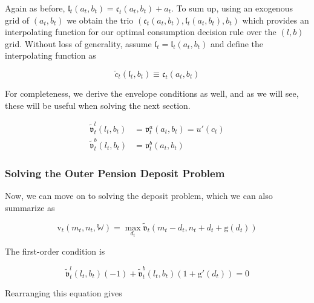 \documentclass{article}
\newcommand{\util}{u}
\newcommand{\bRat}{b}
\newcommand{\cRat}{c}
\newcommand{\vFunc}{\mathrm{v}}
\newcommand{\aRat}{a}
\newcommand{\mRat}{m}
\newcommand{\vOpt}{\tilde{\mathfrak{v}}}
\newcommand{\vEnd}{\mathfrak{v}}
\newcommand{\cEndFunc}{\mathfrak{c}}
\newcommand{\lEndFunc}{\mathfrak{l}}
\newcommand{\nRat}{n}
\newcommand{\dRat}{d}
\newcommand{\gFunc}{\mathrm{g}}
\newcommand{\lRat}{l}
\newcommand{\Work}{\mathbb{W}}
\newcommand{\cTarg}{\check{c}}
\begin{document}
Again as before, $\lEndFunc_{t}(\aRat_{t}, \bRat_{t}) =
    \cEndFunc_{t}(\aRat_{t}, \bRat_{t}) + \aRat_{t}$. To sum up, using an
exogenous
grid of $(\aRat_{t}, \bRat_{t})$ we obtain the trio $(\cEndFunc_{t}(\aRat_{t},
    \bRat_{t}), \lEndFunc_{t}(\aRat_{t},
    \bRat_{t}), \bRat_{t})$ which
provides an
interpolating function for our optimal consumption decision rule over the
$(\lRat, \bRat)$ grid. Without loss of generality, assume $\lEndFunc_{t} =
    \lEndFunc_{t}(\aRat_{t}, \bRat_{t})$ and define the interpolating
function as

\begin{equation}
\cTarg_{t}(\lEndFunc_{t}, \bRat_{t}) \equiv \cEndFunc_{t}(\aRat_{t},
    \bRat_{t})
\end{equation}

For completeness, we derive the envelope conditions as well, and as we will
see, these will be useful when solving the next section.

\begin{equation}
\begin{split}
        \vOpt_{t}^{\lRat}(\lRat_{t}, \bRat_{t}) & =
        \vEnd_{t}^{\aRat}(\aRat_{t}, \bRat_{t}) = \util'(\cRat_{t}) \\
        \vOpt_{t}^{\bRat}(\lRat_{t}, \bRat_{t}) & =
        \vEnd_{t}^{\bRat}(\aRat_{t}, \bRat_{t})
    \end{split}
\end{equation}

\subsubsection{Solving the Outer Pension Deposit Problem}\label{Solving the Outer Pension Deposit Problem}

Now, we can move on to solving the deposit problem, which we can also summarize
as

\begin{equation}
\vFunc_{t}(\mRat_{t}, \nRat_{t}, \Work) = \max_{\dRat_{t}}
    \vOpt_{t}(\mRat_{t}
    - \dRat_{t}, \nRat_{t} + \dRat_{t} + \gFunc(\dRat_{t}))
\end{equation}

The first-order condition is

\begin{equation}
\vOpt_{t}^{\lRat}(\lRat_{t}, \bRat_{t})(-1) +
    \vOpt_{t}^{\bRat}(\lRat_{t}, \bRat_{t})(1+\gFunc'(\dRat_{t})) = 0
\end{equation}

Rearranging this equation gives
\end{document}
